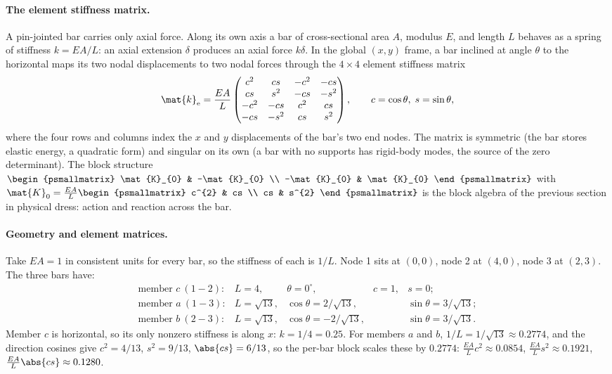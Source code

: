 

\paragraph{The element stiffness matrix.}
A pin-jointed bar carries only axial force. Along its own axis a bar
of cross-sectional area $A$, modulus $E$, and length $L$ behaves as a
spring of stiffness $k = EA/L$: an axial extension $\delta$ produces
an axial force $k\delta$. In the global $(x, y)$ frame, a bar inclined
at angle $\theta$ to the horizontal maps its two nodal displacements
to two nodal forces through the $4 \times 4$ element stiffness matrix
\[
\mat{k}_{\mathrm{e}} = \frac{EA}{L}
\begin{pmatrix}
c^{2} & cs & -c^{2} & -cs \\
cs & s^{2} & -cs & -s^{2} \\
-c^{2} & -cs & c^{2} & cs \\
-cs & -s^{2} & cs & s^{2}
\end{pmatrix},
\qquad c = \cos\theta,\; s = \sin\theta,
\]
where the four rows and columns index the $x$ and $y$ displacements of
the bar's two end nodes. The matrix is symmetric (the bar stores
elastic energy, a quadratic form) and singular on its own (a bar with
no supports has rigid-body modes, the source of the zero determinant).
The block structure $\begin{psmallmatrix} \mat{K}_{0} & -\mat{K}_{0}
\\ -\mat{K}_{0} & \mat{K}_{0} \end{psmallmatrix}$ with $\mat{K}_{0} =
\tfrac{EA}{L}\begin{psmallmatrix} c^{2} & cs \\ cs & s^{2}
\end{psmallmatrix}$ is the block algebra of the previous section in
physical dress: action and reaction across the bar.

\paragraph{Geometry and element matrices.}
Take $EA = 1$ in consistent units for every bar, so the stiffness of
each is $1/L$. Node 1 sits at $(0, 0)$, node 2 at $(4, 0)$, node 3 at
$(2, 3)$. The three bars have:
\[
\begin{array}{lllll}
\text{member } c\ (1\!-\!2): & L = 4, & \theta = 0^{\circ}, & c = 1, & s = 0; \\
\text{member } a\ (1\!-\!3): & L = \sqrt{13}, & \cos\theta = 2/\sqrt{13}, & & \sin\theta = 3/\sqrt{13}; \\
\text{member } b\ (2\!-\!3): & L = \sqrt{13}, & \cos\theta = -2/\sqrt{13}, & & \sin\theta = 3/\sqrt{13}.
\end{array}
\]
Member $c$ is horizontal, so its only nonzero stiffness is along
$x$: $k = 1/4 = 0.25$. For members $a$ and $b$, $1/L = 1/\sqrt{13}
\approx 0.2774$, and the direction cosines give $c^{2} = 4/13$, $s^{2}
= 9/13$, $\abs{cs} = 6/13$, so the per-bar block scales these by
$0.2774$: $\tfrac{EA}{L}c^{2} \approx 0.0854$, $\tfrac{EA}{L}s^{2}
\approx 0.1921$, $\tfrac{EA}{L}\abs{cs} \approx 0.1280$.

